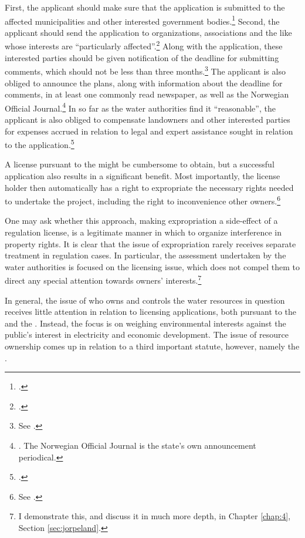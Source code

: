 First, the applicant should make sure that the application is submitted to the affected municipalities and other interested government bodies.\footcite[6]{wra17} Second, the applicant should send the application to organizations, associations and the like whose interests are ``particularly affected''.\footcite[6]{wra17} Along with the application, these interested parties should be given notification of the deadline for submitting comments, which should not be less than three months.\footnote{See \cite[6]{wra17}.} The applicant is also obliged to announce the plans, along with information about the deadline for comments, in at least one commonly read newspaper, as well as the Norwegian Official Journal.\footnote{\cite[6]{wra17}. The Norwegian Official Journal is the state's own announcement periodical.} In so far as the water authorities find it ``reasonable'', the applicant is also obliged to compensate landowners and other interested parties for expenses accrued in relation to legal and expert assistance sought in relation to the application.\footcite[6]{wra17}

A license pursuant to the \cite{wra17} might be cumbersome to obtain, but a successful application also results in a significant benefit. Most importantly, the license holder then automatically has a right to expropriate the necessary rights needed to undertake the project, including the right to inconvenience other owners.\footnote{See \cite[16]{wra17}.} 

One may ask whether this approach, making expropriation a side-effect of a regulation license, is a legitimate manner in which to organize interference in property rights. It is clear that the issue of expropriation rarely receives separate treatment in regulation cases. In particular, the assessment undertaken by the water authorities is focused on the licensing issue, which does not compel them to direct any special attention towards owners' interests.\footnote{I demonstrate this, and discuss it in much more depth, in Chapter \ref{chap:4}, Section \ref{sec:jorpeland}.}

In general, the issue of who owns and controls the water resources in question receives little attention in relation to licensing applications, both pursuant to the \cite{wra17} and the \cite{wra00}. Instead, the focus is on weighing environmental interests against the public's interest in electricity and economic development. The issue of resource ownership comes up in relation to a third important statute, however, namely the  \cite{ica17}.

